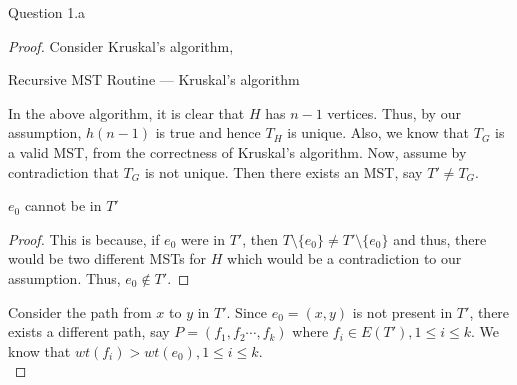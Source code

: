 \begin{solution}{Question 1.a}
\begin{proof}
        Consider Kruskal's algorithm,
        \begin{algorithm}[H]
            \caption{Recursive MST Routine --- Kruskal's algorithm}
            \begin{algorithmic}[1]
                        \Else{}
                        \EndIf{}
                    \EndFor{}
                        \Else{}
                        \EndIf{}
                    \EndFor{}
                \EndProcedure{}
            \end{algorithmic}
        \end{algorithm}
        In the above algorithm, it is clear that $H$ has $n-1$ vertices. Thus, by our assumption, $h(n-1)$ is true and hence $T_H$ is unique. Also, we know that $T_G$ is a valid MST, from the correctness of Kruskal's algorithm. Now, assume by contradiction that $T_G$ is not unique. Then there exists an MST, say $T'\neq T_G$.
        \begin{claim}[]
            $e_0$ cannot be in $T'$
        \end{claim}
        \begin{proof}
            This is because, if $e_0$ were in $T'$, then $T\setminus\{e_0\}\neq T'\setminus\{e_0\}$ and thus, there would be two different MSTs for $H$ which would be a contradiction to our assumption. Thus, $e_0\notin T'$.
        \end{proof}
        Consider the path from $x$ to $y$ in $T'$. Since $e_0=(x, y)$ is not present in $T'$, there exists a different path, say $P=(f_1,f_2\cdots,f_k)$ where $f_i\in E(T'), 1\leq i \leq k$. We know that $wt(f_i) > wt(e_0), 1 \leq i \leq k$.\\

\end{proof}
\end{solution}
